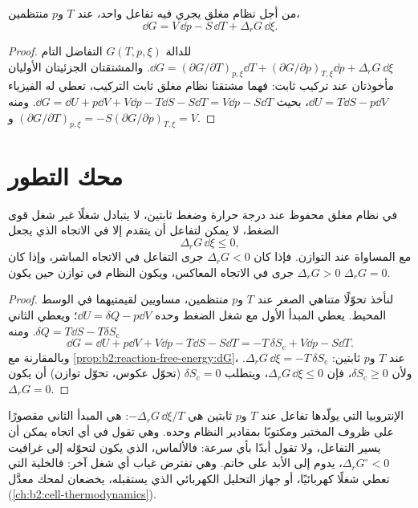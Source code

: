 \begin{proposition}\label{prop:b2:reaction-free-energy:dG}
من أجل نظام مغلق يجري فيه تفاعل واحد، عند $T$ و$p$
منتظمين،
\[
  \dd G = V\,\dd p - S\,\dd T + \Delta_r G\,\dd\xi .
\]
\end{proposition}

\begin{proof}
للدالة $G(T, p, \xi)$ التفاضل التام $\dd G = (\partial G/\partial
T)_{p,\xi}\dd T + (\partial G/\partial p)_{T,\xi}\dd p + \Delta_r G\,\dd\xi$.
والمشتقتان الجزئيتان الأوليان مأخوذتان عند تركيب ثابت: فهما مشتقتا نظام
مغلق ثابت التركيب، تعطي له الفيزياء
$\dd U = T\dd S - p\dd V$، بحيث $\dd G = \dd U + p\dd V + V\dd p - T\dd S
- S\dd T = V\dd p - S\dd T$. ومنه $(\partial G/\partial T)_{p,\xi} = -S$
و$(\partial G/\partial p)_{T,\xi} = V$.
\end{proof}

\section{محك التطور}

\begin{theorem}\label{thm:b2:reaction-free-energy:evolution}
في نظام مغلق محفوظ عند درجة حرارة وضغط ثابتين، لا يتبادل شغلًا غير شغل
قوى الضغط، لا يمكن لتفاعل أن يتقدم إلا في الاتجاه الذي يجعل
\[
  \Delta_r G\,\dd\xi \leq 0 ,
\]
مع المساواة عند التوازن. فإذا كان $\Delta_r G < 0$ جرى التفاعل في
الاتجاه المباشر، وإذا كان $\Delta_r G > 0$ جرى في الاتجاه المعاكس، ويكون
النظام في توازن حين يكون $\Delta_r G = 0$.
\end{theorem}

\begin{proof}
لنأخذ تحوّلًا متناهي الصغر عند $T$ و$p$ منتظمين، مساويين لقيمتيهما في
الوسط المحيط. يعطي المبدأ الأول مع شغل الضغط وحده $\dd U = \delta Q
- p\dd V$؛ ويعطي الثاني $\delta Q = T\dd S - T\delta S_{\text{c}}$. ومنه
\[
  \dd G = \dd U + p\dd V + V\dd p - T\dd S - S\dd T = -T\,\delta
  S_{\text{c}} + V\dd p - S\dd T .
\]
وبالمقارنة مع \cref{prop:b2:reaction-free-energy:dG}، عند $T$ و$p$ ثابتين:
$\Delta_r G\,\dd\xi = -T\,\delta S_{\text{c}}$. ولأن $\delta S_{\text{c}}
\geq 0$، فإن $\Delta_r G\,\dd\xi \leq 0$، ويتطلب $\delta S_{\text{c}} = 0$
(تحوّل عكوس، تحوّل توازن) أن يكون $\Delta_r G = 0$.
\end{proof}

\begin{remark}\label{rem:b2:reaction-free-energy:criterion}
الإنتروبيا التي يولّدها تفاعل عند $T$ و$p$ ثابتين هي $-\Delta_r G\,
\dd\xi/T$:  هي المبدأ الثاني مقصورًا على ظروف المختبر ومكتوبًا
بمقادير النظام وحده. وهي تقول في أي اتجاه يمكن أن يسير التفاعل، ولا تقول
أبدًا بأي سرعة: فالألماس، الذي يكون لتحوّله إلى غرافيت $\Delta_r G^\circ < 0$،
يدوم إلى الأبد على خاتم. وهي تفترض غياب أي شغل آخر: فالخلية التي تعطي
شغلًا كهربائيًا، أو جهاز التحليل الكهربائي الذي يستقبله، يخضعان لمحك معدَّل
(\cref{ch:b2:cell-thermodynamics}).
\end{remark}


